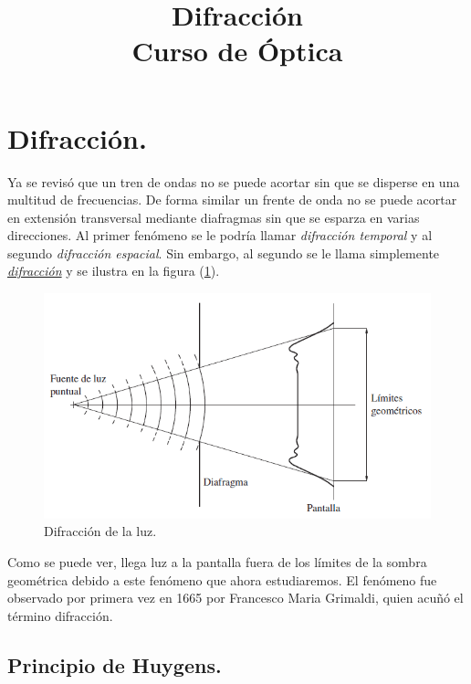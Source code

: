 \documentclass[14pt]{extarticle}
\title{\vspace*{-2cm} Difracción  \\ Curso de Óptica \vspace{-3ex}}
\date{ }
\begin{document}
\maketitle

\vspace*{-2cm}

\section{Difracción.}

Ya se revisó que un tren de ondas no se puede acortar sin que se disperse en una multitud de frecuencias. De forma similar un frente de onda no se puede acortar en extensión transversal mediante diafragmas sin que se esparza en varias direcciones. Al primer fenómeno se le podría llamar \textit{difracción temporal} y al segundo \textit{difracción espacial}. Sin embargo, al segundo se le llama simplemente \underline{\textit{difracción}} y se ilustra en la figura (\ref{fig:figura_X_01}).
\begin{figure}[H]
    \centering
    \includegraphics[scale=0.75]{Imagenes/Difraccion_01.png}
    \caption{Difracción de la luz.}
    \label{fig:figura_X_01}
\end{figure}
Como se puede ver, llega luz a la pantalla fuera de los límites de la sombra geométrica debido a este fenómeno que ahora estudiaremos. El fenómeno fue observado por primera vez en 1665 por Francesco Maria Grimaldi, quien acuñó el término difracción.

\subsection{Principio de Huygens.}
\end{document}
